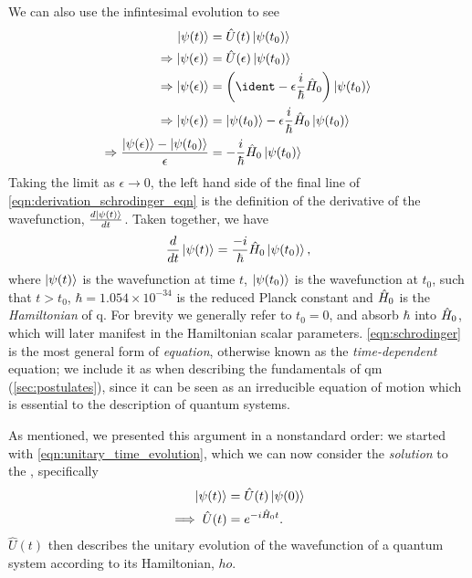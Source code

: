 \par 
We can also use the infintesimal evolution to see 
\begin{equation}
    \label{eqn:derivation_schrodinger_eqn}
    \begin{split}
        \ket{\psi(t)} &= \hat{U}(t) \ket{\psi(t_0)}
        \\ \Rightarrow \ket{\psi(\epsilon)} &= \hat{U}(\epsilon) \ket{\psi(t_0)}
        \\ \Rightarrow 
        \ket{\psi(\epsilon)} &= \left(\ident - \epsilon \frac{i}{\hbar} \ho \right) \ket{\psi(t_0)}
        \\ \Rightarrow \ket{\psi(\epsilon)} &= \ket{\psi(t_0)} - \epsilon \frac{i}{\hbar} \ho \ket{\psi(t_0)}
        \\ \Rightarrow \frac{\ket{\psi(\epsilon)} - \ket{\psi(t_0)} }{\epsilon}  &= - \frac{i}{\hbar} \ho \ket{\psi(t_0)}
    \end{split}
\end{equation}
Taking the limit as $\epsilon \rightarrow 0 $, the left hand side of the final line of \cref{eqn:derivation_schrodinger_eqn} is the definition
    of the derivative of the wavefunction, $\frac{d \ket{\psi(t)}}{dt}$. 
Taken together, we have 
\begin{equation}
    \label{eqn:schrodinger}
    \frac{d}{dt} \ket{\psi(t)} = \frac{-i}{\hbar} \hat{H}_0 \ket{\psi(t_0)},
\end{equation}
    where $\ket{\psi(t)}$ is the wavefunction at time $t$, 
    $\ket{\psi(t_0)}$ is the wavefunction at $t_0$, such that $t > t_0$, 
    $\hbar = 1.054 \times 10^{-34}$ is the reduced Planck constant and 
    $\hat{H}_0$ is the \emph{Hamiltonian} of \gls{q}. 
For brevity we generally refer to $t_0 = 0$, and absorb $\hbar$ into $\hat{H}_0$, which will later manifest in the Hamiltonian scalar parameters. 
\cref{eqn:schrodinger} is the most general form of \emph{\schrodinger equation}, 
    otherwise known as the \emph{time-dependent} \schrodinger equation; 
    we include it as  when describing the fundamentals of \gls{qm} (\cref{sec:postulates}), 
    since it can be seen as an irreducible equation of motion which is essential to the description of quantum systems. 
\par 

As mentioned, we presented this argument in a nonstandard order:
    we started with \cref{eqn:unitary_time_evolution}, which we can now consider the \emph{solution} to the \schrodinger, 
    specifically
\begin{equation}
    \label{eqn:unitary_evolution}
    \begin{split}
        \ket{\psi(t)} &= \hat{U}(t) \ket{\psi(0)}
        \\
        \implies \hat{U}(t) &= e^{-i \hat{H}_0 t}.
    \end{split}
\end{equation}
$\hat{U}(t)$ then describes the unitary evolution of the wavefunction of a 
    quantum system according to its Hamiltonian, $ho$. 
\par 

